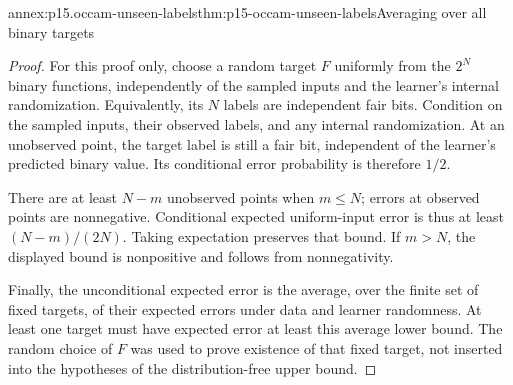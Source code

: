 \begin{annexitem}{annex:p15.occam-unseen-labels}{thm:p15-occam-unseen-labels}{Averaging over all binary targets}
\begin{proof}
For this proof only, choose a random target \(F\) uniformly
from the \(2^N\) binary functions, independently of the
sampled inputs and the learner's internal randomization.
Equivalently, its \(N\) labels are independent fair bits.
Condition on the sampled inputs, their observed labels,
and any internal randomization. At an unobserved point,
the target label is still a fair bit, independent of
the learner's predicted binary value. Its conditional
error probability is therefore \(1/2\).

There are at least \(N-m\) unobserved points when
\(m\leq N\); errors at observed points are nonnegative.
Conditional expected uniform-input error is thus at
least \((N-m)/(2N)\). Taking expectation preserves
that bound. If \(m>N\), the displayed bound is
nonpositive and follows from nonnegativity.

Finally, the unconditional expected error is the
average, over the finite set of fixed targets, of
their expected errors under data and learner randomness.
At least one target must have expected error at
least this average lower bound. The random choice
of \(F\) was used to prove existence of that fixed
target, not inserted into the hypotheses of the
distribution-free upper bound.
\end{proof}
\end{annexitem}
